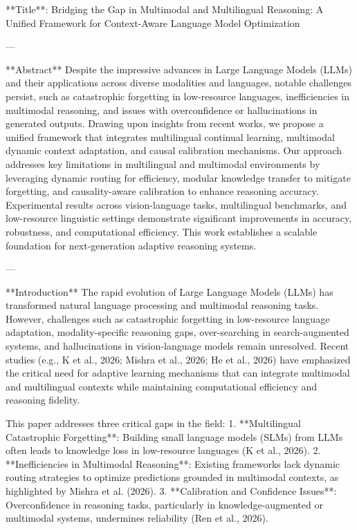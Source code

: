 **Title**: Bridging the Gap in Multimodal and Multilingual Reasoning: A Unified Framework for Context-Aware Language Model Optimization  

---

**Abstract**  
Despite the impressive advances in Large Language Models (LLMs) and their applications across diverse modalities and languages, notable challenges persist, such as catastrophic forgetting in low-resource languages, inefficiencies in multimodal reasoning, and issues with overconfidence or hallucinations in generated outputs. Drawing upon insights from recent works, we propose a unified framework that integrates multilingual continual learning, multimodal dynamic context adaptation, and causal calibration mechanisms. Our approach addresses key limitations in multilingual and multimodal environments by leveraging dynamic routing for efficiency, modular knowledge transfer to mitigate forgetting, and causality-aware calibration to enhance reasoning accuracy. Experimental results across vision-language tasks, multilingual benchmarks, and low-resource linguistic settings demonstrate significant improvements in accuracy, robustness, and computational efficiency. This work establishes a scalable foundation for next-generation adaptive reasoning systems.  

---

**Introduction**  
The rapid evolution of Large Language Models (LLMs) has transformed natural language processing and multimodal reasoning tasks. However, challenges such as catastrophic forgetting in low-resource language adaptation, modality-specific reasoning gaps, over-searching in search-augmented systems, and hallucinations in vision-language models remain unresolved. Recent studies (e.g., K et al., 2026; Mishra et al., 2026; He et al., 2026) have emphasized the critical need for adaptive learning mechanisms that can integrate multimodal and multilingual contexts while maintaining computational efficiency and reasoning fidelity.  

This paper addresses three critical gaps in the field:  
1. **Multilingual Catastrophic Forgetting**: Building small language models (SLMs) from LLMs often leads to knowledge loss in low-resource languages (K et al., 2026).  
2. **Inefficiencies in Multimodal Reasoning**: Existing frameworks lack dynamic routing strategies to optimize predictions grounded in multimodal contexts, as highlighted by Mishra et al. (2026).  
3. **Calibration and Confidence Issues**: Overconfidence in reasoning tasks, particularly in knowledge-augmented or multimodal systems, undermines reliability (Ren et al., 2026).  

